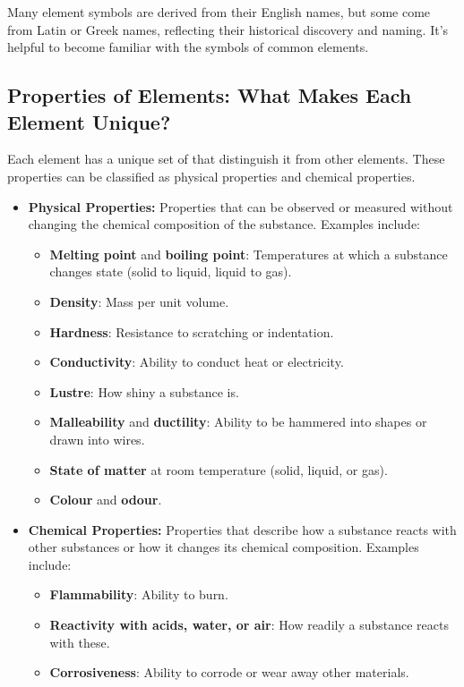 Many element symbols are derived from their English names, but some come from Latin or Greek names, reflecting their historical discovery and naming.  It’s helpful to become familiar with the symbols of common elements.

\subsection{Properties of Elements: What Makes Each Element Unique?}

Each element has a unique set of  that distinguish it from other elements. These properties can be classified as physical properties and chemical properties.

\begin{itemize}
    \item \textbf{Physical Properties:} Properties that can be observed or measured without changing the chemical composition of the substance. Examples include:
        \begin{itemize}
            \item \textbf{Melting point} and \textbf{boiling point}: Temperatures at which a substance changes state (solid to liquid, liquid to gas).
            \item \textbf{Density}: Mass per unit volume.
            \item \textbf{Hardness}: Resistance to scratching or indentation.
            \item \textbf{Conductivity}: Ability to conduct heat or electricity.
            \item \textbf{Lustre}: How shiny a substance is.
            \item \textbf{Malleability} and \textbf{ductility}: Ability to be hammered into shapes or drawn into wires.
            \item \textbf{State of matter} at room temperature (solid, liquid, or gas).
            \item \textbf{Colour} and \textbf{odour}.
        \end{itemize}
    \item \textbf{Chemical Properties:} Properties that describe how a substance reacts with other substances or how it changes its chemical composition. Examples include:
        \begin{itemize}
            \item \textbf{Flammability}: Ability to burn.
            \item \textbf{Reactivity with acids, water, or air}: How readily a substance reacts with these.
            \item \textbf{Corrosiveness}: Ability to corrode or wear away other materials.
        \end{itemize}
\end{itemize}

